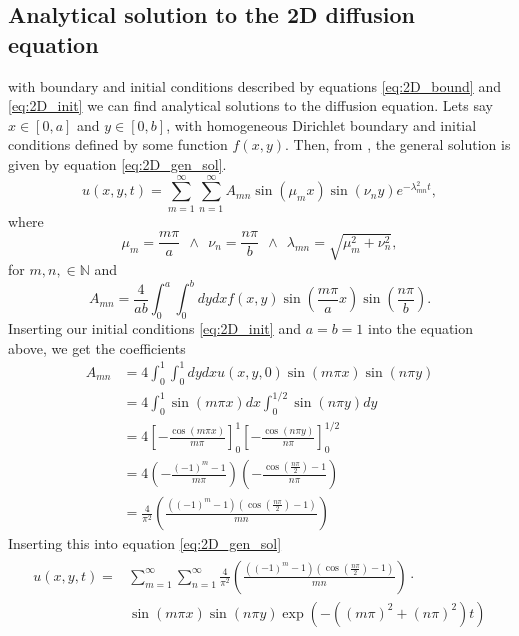 \documentclass[reprint, english,notitlepage,nofootinbib]{revtex4-1}  %
\begin{document}
\subsection*{Analytical solution to the 2D diffusion equation}
with boundary and initial conditions described by equations \eqref{eq:2D_bound} and \eqref{eq:2D_init} we can find analytical solutions to the diffusion equation. Lets say $x\in[0,a]$ and $y\in[0,b]$, with homogeneous Dirichlet boundary and initial conditions defined by some function $f(x,y)$. Then, from \cite{2D_diffusion}, the general solution is given by equation \eqref{eq:2D_gen_sol}.
\begin{equation}
	\label{eq:2D_gen_sol}
	u(x,y,t) = \sum_{m=1}^{\infty}\sum_{n=1}^{\infty}A_{mn}\sin(\mu_m x)\sin(\nu_n y)e^{-\lambda^2_{mn}t},
\end{equation}
where
\begin{equation*}
	\mu_m = \frac{m\pi}{a} \ \ \wedge \ \ \nu_n=\frac{n\pi}{b} \ \ \wedge \ \ \lambda_{mn} = \sqrt{\mu_m^2 + \nu_n^2},
\end{equation*}
for $m,n,\in\mathbb{N}$ and
\begin{equation*}
	A_{mn} = \frac{4}{ab}\int_{0}^{a}\int_{0}^{b}dydxf(x,y)\sin(\frac{m\pi}{a}x)\sin(\frac{n\pi}{b}).
\end{equation*}
Inserting our initial conditions \eqref{eq:2D_init} and $a=b=1$ into the equation above, we get the coefficients
\begin{align*}
	A_{mn} &= 4\int_{0}^{1}\int_{0}^{1}dydxu(x,y,0)\sin(m\pi x)\sin(n\pi y) \\
	&= 4\int_{0}^{1}\sin(m\pi x)dx \int_{0}^{1/2}\sin(n\pi y)dy \\
	&= 4\left[-\frac{\cos(m\pi x)}{m\pi}\right]_0^1\left[-\frac{\cos(n\pi y)}{n\pi}\right]_0^{1/2} \\
	&= 4\left(-\frac{(-1)^{m} - 1}{m\pi}\right)\left(-\frac{\cos(\frac{n\pi}{2}) - 1}{n\pi}\right) \\
	&= \frac{4}{\pi^2}\left(\frac{\left((-1)^m - 1\right)\left(\cos(\frac{n\pi}{2}) - 1\right)}{mn}\right)
\end{align*}
Inserting this into equation \eqref{eq:2D_gen_sol}
\begin{align}
\begin{split}
\label{eq:2D_closed_sol}
	u(x,y,t) =& \sum_{m=1}^{\infty}\sum_{n=1}^{\infty}\frac{4}{\pi^2}\left(\frac{\left((-1)^m - 1\right)\left(\cos(\frac{n\pi}{2}) - 1\right)}{mn}\right)\cdot\\
	&\sin(m\pi x)\sin(n\pi y)\exp(-((m\pi)^2 + (n\pi)^2)t)
\end{split}
\end{align}
\end{document}
